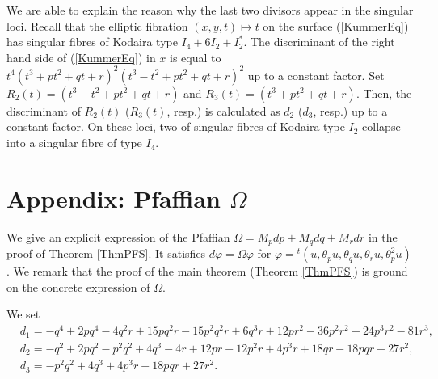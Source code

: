 \documentclass[10pt]{article}
\begin{document}
We are able to explain the reason why the last two divisors appear in the singular loci.
Recall that the elliptic fibration $(x,y,t) \mapsto t$ on the surface (\ref{KummerEq}) has  singular fibres of Kodaira type $I_4+6 I_2 + I_2^*$.
The discriminant of the right hand side of (\ref{KummerEq}) in $x$ is equal to
$
t^4 (t^3+p t^2  + q t +r  )^2 (t^3  - t^2 + p t^2+ q t   + r )^2
$
up to a constant factor.
Set $R_2(t)=(t^3  - t^2 + p t^2+ q t   + r ) $ and $R_3(t) =(t^3+p t^2  + q t +r  ) $.
Then, the discriminant of $R_2(t)$ ($R_3(t)$, resp.) is calculated as $d_2$ ($d_3$, resp.)  up to a constant factor.
On these loci,
two of singular fibres of Kodaira type $I_2$ collapse into a singular fibre of type $I_4$.


 

\section*{Appendix: Pfaffian $\Omega$ }

We give an explicit expression of the Pfaffian $\Omega = M_p dp + M_q dq + M_r dr$ in the proof of Theorem \ref{ThmPFS}.
It satisfies $d \varphi = \Omega \varphi$
for $\varphi= {}^t  (u,\theta_p u, \theta_q u, \theta_r u, \theta_{p}^2 u)$.
We remark that the proof of the main theorem (Theorem \ref{ThmPFS}) is ground on the concrete expression of $\Omega$.

We set
{\small
\begin{align*}
&d_1=-q^4 + 2 p q^4 - 4 q^2 r + 15 p q^2 r - 15 p^2 q^2 r + 6 q^3 r + 12 p r^2 - 36 p^2 r^2 + 24 p^3 r^2 - 81 r^3,\\
 &d_2= -q^2 + 2 p q^2 - p^2 q^2 + 4 q^3 - 4 r + 12 p r - 12 p^2 r + 
 4 p^3 r + 18 q r - 18 p q r + 27 r^2,\\
 & d_3=-p^2 q^2 + 4 q^3 + 4 p^3 r - 18 p q r + 27 r^2.
\end{align*}
}
\end{document}
